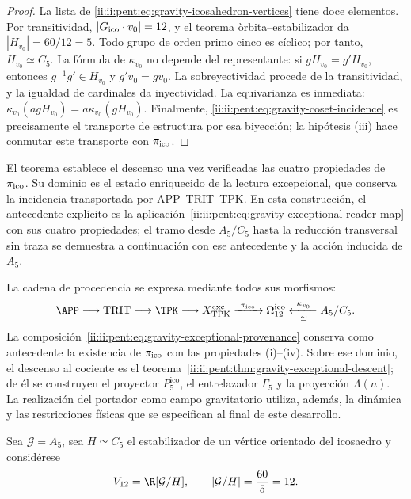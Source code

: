 \begin{proof}
La lista de \eqref{ii:ii:pent:eq:gravity-icosahedron-vertices} tiene doce elementos.
Por transitividad, \(|G_{\rm ico}\cdot v_0|=12\), y el teorema
\`orbita--estabilizador da \(|H_{v_0}|=60/12=5\). Todo grupo de orden
primo cinco es c\'iclico; por tanto, \(H_{v_0}\simeq C_5\). La f\'ormula de
\(\kappa_{v_0}\) no depende del representante: si
\(gH_{v_0}=g'H_{v_0}\), entonces \(g^{-1}g'\in H_{v_0}\) y
\(g'v_0=gv_0\). La sobreyectividad procede de la transitividad, y la
igualdad de cardinales da inyectividad. La equivarianza es inmediata:
\(\kappa_{v_0}(agH_{v_0})=a\kappa_{v_0}(gH_{v_0})\). Finalmente,
\eqref{ii:ii:pent:eq:gravity-coset-incidence} es precisamente el transporte de
estructura por esa biyecci\'on; la hip\'otesis (iii) hace conmutar este
transporte con \(\pi_{\rm ico}\).
\end{proof}

El teorema establece el descenso una vez verificadas las cuatro
propiedades de \(\pi_{\rm ico}\). Su dominio es el estado enriquecido
de la lectura excepcional, que conserva la incidencia transportada por
APP--TRIT--TPK. En esta construcción, el antecedente explícito es la
aplicación~\eqref{ii:ii:pent:eq:gravity-exceptional-reader-map} con sus cuatro
propiedades; el tramo desde \(A_5/C_5\) hasta la reducción transversal sin
traza se demuestra a continuación con ese antecedente y la acción inducida
de \(A_5\).

La cadena de procedencia se expresa mediante todos sus morfismos:
\begin{equation}
\label{ii:ii:pent:eq:gravity-exceptional-provenance}
\APP\longrightarrow\mathrm{TRIT}\longrightarrow\TPK
\longrightarrow X_{\rm TPK}^{\rm exc}
\xrightarrow{\ \pi_{\rm ico}\ }\Omega_{12}^{\rm ico}
\xleftarrow[\simeq]{\ \kappa_{v_0}\ }A_5/C_5.
\end{equation}
La composición~\eqref{ii:ii:pent:eq:gravity-exceptional-provenance} conserva
como antecedente la existencia de \(\pi_{\rm ico}\) con las propiedades
(i)--(iv). Sobre ese dominio, el descenso al cociente es el
teorema~\ref{ii:ii:pent:thm:gravity-exceptional-descent}; de él se construyen
el proyector \(P^{\mathrm{ico}}_5\), el entrelazador \(\Gamma_5\) y la
proyección \(\Lambda(n)\). La realización del portador como campo
gravitatorio utiliza, además, la dinámica y las restricciones físicas que
se especifican al final de este desarrollo.

Sea \(\mathcal G=A_5\), sea \(H\simeq C_5\) el estabilizador de un v\'ertice
orientado del icosaedro y consid\'erese
\begin{equation}
\label{ii:ii:pent:eq:gravity-v12}
V_{12}=\R[\mathcal G/H],
\qquad |\mathcal G/H|=\frac{60}{5}=12.
\end{equation}

